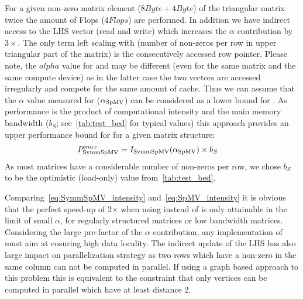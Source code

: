 For a given non-zero matrix element ($8 Byte + 4 Byte$) of the triangular matrix twice the amount of Flops ($4 Flops$)  are performed. In addition we have indirect access to the LHS vector (read and write) which increases the $\alpha$ contribution by $3\times$. The only term left scaling with \NNZRSYMM (number of non-zeros per row in upper triangular part of the matrix) is the consecutively accessed row pointer. Please note, the $alpha$ value for \SpMV and \SymmSpmv may be different (even for the same matrix and the same compute device) as in the latter case the two vectors are accessed irregularly and compete for the same amount of cache. Thus we can assume that the $\alpha$ value measured for \SpMV ($\alpha_\mathrm{SpMV}$) can be considered as a lower bound for \SymmSpmv. As performance is the product of computational intensity and the main memory bandwidth ($b_S$; see~\cref{tab:test_bed} for typical values) this approach provides an upper performance bound for \SymmSpmv for a given matrix structure:
 \begin{align}
\label{eq:SymmSpMV_performance}
P^{max}_\mathrm{\SymmSpmv}  &= I_\mathrm{\SymmSpmv} (\alpha_\mathrm{\SpMV})  \times b_S
\end{align}
As most matrices have a considerable number of non-zeros per row, we chose $b_S$ to be the optimistic (load-only) value  from~\cref{tab:test_bed}.

Comparing~\cref{eq:SymmSpMV_intensity} and~\cref{eq:SpMV_intensity} it is obvious that the perfect speed-up of 2$\times$ when using \SymmSpmv instead of \SpMV is only attainable in the limit of small $\alpha$, \ie for regularly structured matrices or low bandwidth matrices. Considering the large pre-factor of the $\alpha$ contribution, any implementation of \SymmSpmv must aim at ensuring high data locality. The indirect update of the LHS has also large impact on parallelization strategy as two rows which have a non-zero in the same column can not be computed in parallel. If using a graph based approach to this problem this is equivalent to the constraint that only vertices can be computed in parallel which have at least distance 2.

